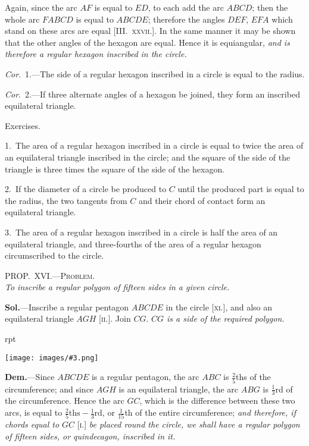 \documentclass[oneside]{book}
\newcounter{wrapwidth}
\newcommand\myprop[2]{
\bigskip\Needspace*{4\baselineskip}\begin{center}\textsc{#1}\\\medskip\emph{#2}\par\end{center}
}
\newcommand\exhead[1]{
\Needspace*{5\baselineskip}\begin{center}
\textsf{#1}
\end{center}
}
\newcommand\imgflow[3]{
\setcounter{wrapwidth}{#1}
\begin{wrapfigure}[#2]{r}{\value{wrapwidth}pt}
\begin{center}
\vspace{-0.3in}
\texttt{[image: images/\#3.png]}
\end{center}
\end{wrapfigure}
}
\begin{document}
Again, since the arc $AF$ is equal to $ED$, to each add
the arc $ABCD$; then the whole arc $FABCD$ is equal to
$ABCDE$; therefore the angles $DEF$, $EFA$ which stand
on these arcs are equal [\textsc{III\@.~xxvii.}]. In the same
manner it may be shown that the other angles of the
hexagon are equal. Hence it is equiangular, \emph{and is
therefore a regular hexagon inscribed in the circle.}


\emph{Cor}.~1.---The side of a regular hexagon inscribed in
a circle is equal to the radius.

\emph{Cor}.~2.---If three alternate angles of a hexagon be
joined, they form an inscribed equilateral triangle.

\exhead{Exercises.}

\begin{footnotesize}
1.~The area of a regular hexagon inscribed in a circle is equal to
twice the area of an equilateral triangle inscribed in the circle;
and the square of the side of the triangle is three times the square
of the side of the hexagon.

2.~If the diameter of a circle be produced to $C$ until the produced
part is equal to the radius, the two tangents from $C$ and
their chord of contact form an equilateral triangle.

3.~The area of a regular hexagon inscribed in a circle is half
the area of an equilateral triangle, and three-fourths of the area
of a regular hexagon circumscribed to the circle.
\par\end{footnotesize}

\myprop{PROP\@.~XVI\@.---Problem.}{To inscribe a regular polygon of fifteen sides in a given circle.}

\textbf{Sol.}---Inscribe a regular pentagon $ABCDE$ in the
circle [\textsc{xi.}], and also an equilateral triangle $AGH$ [\textsc{ii.}].
Join $CG$. \emph{$CG$ is a side of the required polygon.}

\imgflow{110}{9}{f168}

\textbf{Dem.}---Since $ABCDE$ is a regular pentagon, the arc
$ABC$ is $\frac{2}{5}$ths of the circumference;
and since $AGH$ is an equilateral
triangle, the arc $ABG$ is $\frac{1}{3}$rd of
the circumference. Hence the arc
$GC$, which is the difference between
these two arcs, is equal to
$\frac{2}{5}\text{ths} - \frac{1}{3}$rd, or $\frac{1}{15}$th of the entire
circumference; \emph{and therefore, if
chords equal to $GC$} [\textsc{i.}] \emph{be placed
round the circle, we shall have a
regular polygon of fifteen sides, or quindecagon, inscribed
in it.}\par\smallskip
\end{document}
